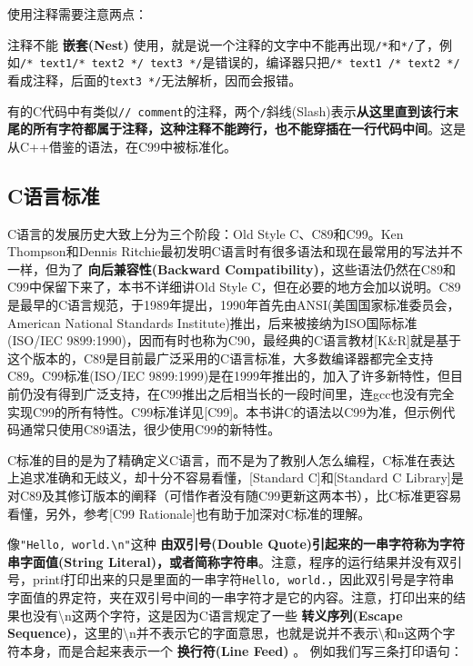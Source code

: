 \documentclass[12pt]{book}
\begin{document}
使用注释需要注意两点：


  注释不能 \textbf{嵌套(Nest)}
  使用，就是说一个注释的文字中不能再出现\texttt{/*}和\texttt{*/}了，例如\texttt{/*\ text1/*\ text2\ */\ text3\ */}是错误的，编译器只把\texttt{/*\ text1\ /*\ text2\ */}看成注释，后面的\texttt{text3\ */}无法解析，因而会报错。

  有的C代码中有类似\texttt{//\ comment}的注释，两个\texttt{/}斜线(Slash)表示\textbf{从这里直到该行末尾的所有字符都属于注释，这种注释不能跨行，也不能穿插在一行代码中间}。这是从C++借鉴的语法，在C99中被标准化。


\subsection{C语言标准}

C语言的发展历史大致上分为三个阶段：Old Style C、C89和C99。Ken
Thompson和Dennis
Ritchie最初发明C语言时有很多语法和现在最常用的写法并不一样，但为了
\textbf{向后兼容性(Backward
Compatibility)}，这些语法仍然在C89和C99中保留下来了，本书不详细讲Old
Style
C，但在必要的地方会加以说明。C89是最早的C语言规范，于1989年提出，1990年首先由ANSI(美国国家标准委员会，American
National Standards Institute)推出，后来被接纳为ISO国际标准(ISO/IEC
9899:1990)，因而有时也称为C90，最经典的C语言教材{[}K\&R{]}就是基于这个版本的，C89是目前最广泛采用的C语言标准，大多数编译器都完全支持C89。C99标准(ISO/IEC
9899:1999)是在1999年推出的，加入了许多新特性，但目前仍没有得到广泛支持，在C99推出之后相当长的一段时间里，连gcc也没有完全实现C99的所有特性。C99标准详见{[}C99{]}。本书讲C的语法以C99为准，但示例代码通常只使用C89语法，很少使用C99的新特性。

C标准的目的是为了精确定义C语言，而不是为了教别人怎么编程，C标准在表达上追求准确和无歧义，却十分不容易看懂，{[}Standard
C{]}和{[}Standard C
Library{]}是对C89及其修订版本的阐释（可惜作者没有随C99更新这两本书），比C标准更容易看懂，另外，参考{[}C99
Rationale{]}也有助于加深对C标准的理解。

像\texttt{"Hello,\ world.\textbackslash{}n"}这种 \textbf{由双引号(Double
Quote)引起来的一串字符称为字符串字面值(String
Literal)，或者简称字符串}。注意，程序的运行结果并没有双引号，printf打印出来的只是里面的一串字符\texttt{Hello,\ world.}，因此双引号是字符串字面值的界定符，夹在双引号中间的一串字符才是它的内容。注意，打印出来的结果也没有\textbackslash n这两个字符，这是因为C语言规定了一些
\textbf{转义序列(Escape
Sequence)}，这里的\textbackslash n并不表示它的字面意思，也就是说并不表示\textbackslash 和n这两个字符本身，而是合起来表示一个
\textbf{换行符(Line Feed)} 。 例如我们写三条打印语句：
\end{document}

